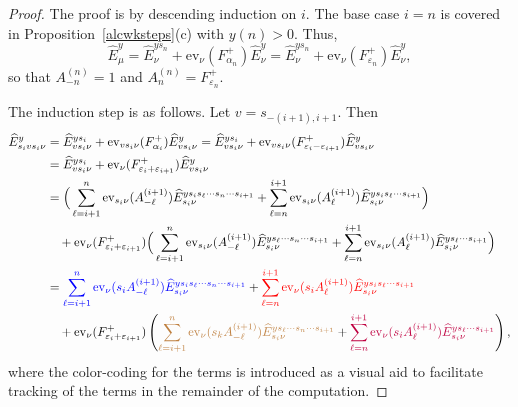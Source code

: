 \documentclass[11pt]{article}
\theoremstyle{plain}
\theoremstyle{definition}
\theoremstyle{remark}
\numberwithin{equation}{section}
\def\ev{\mathrm{ev}}
\newcounter{r}
\newcounter{s}
\begin{document}
\begin{proof}
The proof is by descending induction on $i$.  The base case $i=n$ is covered in Proposition~\ref{alcwksteps}(c) with $y(n)>0$. Thus,
$$\widehat{E}^y_\mu 
= \widehat{E}^{ys_n}_\nu + \ev_\nu(F^+_{\alpha_n})\widehat{E}^y_\nu
= \widehat{E}^{ys_n}_\nu + \ev_\nu(F^+_{\varepsilon_n})\widehat{E}^y_\nu,
$$
so that $A^{(n)}_{-n} = 1$ and $A^{(n)}_n = F_{\varepsilon_n}^+$.

The induction step is as follows.  Let $v = s_{-(i+1),i+1}$.
Then
\begin{align*}
\widehat{E}^y_{s_i v s_i\nu}
&= \widehat{E}^{ys_i}_{vs_i\nu} + \ev_{vs_i\nu}(F^+_{\alpha_i})\widehat{E}^y_{vs_i\nu}
= \widehat{E}^{ys_i}_{vs_i\nu} + \ev_{vs_i\nu}(F^+_{\varepsilon_i-\varepsilon_{i+1}})\widehat{E}^y_{vs_i\nu}
\\
&= \widehat{E}^{ys_i}_{vs_i\nu} + \ev_\nu(F^+_{\varepsilon_i+\varepsilon_{i+1}})\widehat{E}^y_{vs_i\nu}
\\
&= \Big(\sum_{\ell=i+1}^n \ev_{s_i\nu}(A^{(i+1)}_{-\ell})\widehat{E}^{ys_is_\ell\cdots s_n\cdots s_{i+1}}_{s_i\nu}
+\sum_{\ell=n}^{i+1} \ev_{s_i\nu}(A^{(i+1)}_\ell) \widehat{E}^{ys_i s_\ell\cdots s_{i+1}}_{s_i\nu}  \Big)
\\
&\quad
+ \ev_{\nu}(F^+_{\varepsilon_i+\varepsilon_{i+1}}) 
\Big(\sum_{\ell=i+1}^n \ev_{s_i\nu}(A^{(i+1)}_{-\ell})\widehat{E}^{ys_\ell\cdots s_n\cdots s_{i+1}}_{s_i\nu}
+\sum_{\ell=n}^{i+1} \ev_{s_i\nu}(A^{(i+1)}_\ell) \widehat{E}^{y s_\ell\cdots s_{i+1}}_{s_i\nu}  \Big)
\\
&= 
{\color{blue}\sum_{\ell=i+1}^n \ev_{\nu}(s_iA^{(i+1)}_{-\ell})\widehat{E}^{ys_is_\ell\cdots s_n\cdots s_{i+1}}_{s_i\nu}}
+
{\color{red} \sum_{\ell=n}^{i+1} \ev_{\nu}(s_iA^{(i+1)}_\ell) \widehat{E}^{ys_i s_\ell\cdots s_{i+1}}_{s_i\nu}} 
\\
&\quad
+ \ev_{\nu}(F^+_{\varepsilon_i+\varepsilon_{i+1}}) 
\left({\color{brown} \sum_{\ell=i+1}^n \ev_{\nu}(s_kA^{(i+1)}_{-\ell})\widehat{E}^{ys_\ell\cdots s_n\cdots s_{i+1}}_{s_i\nu} }
+ {\color{purple} \sum_{\ell=n}^{i+1} \ev_{\nu}(s_iA^{(i+1)}_\ell) \widehat{E}^{y s_\ell\cdots s_{i+1}}_{s_i\nu} } \right),
\end{align*}
where the color-coding for the terms is introduced as a visual aid to facilitate tracking of the terms in the remainder of the computation.


\end{proof}
\end{document}

